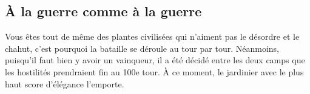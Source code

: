 \subsection{À la guerre comme à la guerre}
Vous êtes tout de même des plantes civilisées qui n'aiment pas le désordre et le chahut, c'est pourquoi la bataille se déroule au tour par tour. Néanmoins, puisqu'il faut bien y avoir un vainqueur, il a été décidé entre les deux camps que les hostilités prendraient fin au 100e tour. À ce moment, le jardinier avec le plus haut score d'élégance l'emporte.